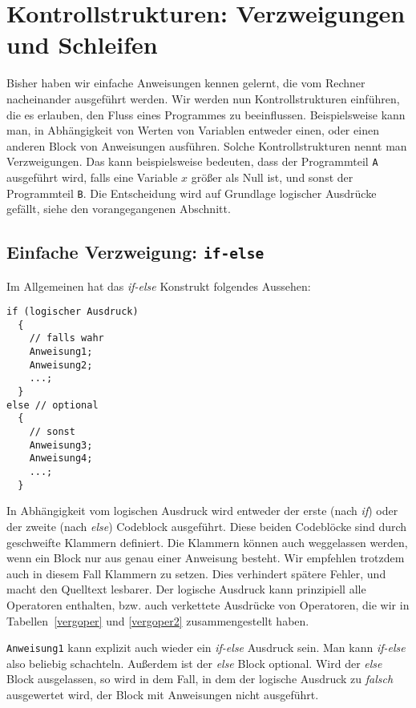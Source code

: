 \section{Kontrollstrukturen: Verzweigungen und Schleifen}

Bisher haben wir einfache Anweisungen kennen gelernt, die vom Rechner nacheinander ausgeführt werden.
Wir werden nun Kontrollstrukturen einführen, die es erlauben, den Fluss eines Programmes zu beeinflussen.
Beispielsweise kann man, in Abhängigkeit von Werten von Variablen entweder einen, oder einen anderen Block von Anweisungen ausführen.
Solche Kontrollstrukturen nennt man Verzweigungen.
Das kann beispielsweise bedeuten, dass der Programmteil \texttt{A} ausgeführt wird, falls eine Variable $x$ größer als Null ist, und sonst der Programmteil \texttt{B}.
Die Entscheidung wird auf Grundlage logischer Ausdrücke gefällt, siehe den vorangegangenen Abschnitt.

\subsection{Einfache Verzweigung: \texttt{if-else}}

Im Allgemeinen hat das \emph{if-else} Konstrukt folgendes Aussehen:

\begin{minipage}{\linewidth}
\begin{lstlisting}[caption={if-else Statement}, belowcaptionskip=0.3em]
if (logischer Ausdruck)
  {
    // falls wahr
    Anweisung1;
    Anweisung2;
    ...;
  }
else // optional
  {
    // sonst
    Anweisung3;
    Anweisung4;
    ...;
  }
\end{lstlisting}
\end{minipage}
In Abhängigkeit vom logischen Ausdruck wird entweder der erste (nach \emph{if}) oder der zweite (nach \emph{else}) Codeblock ausgeführt.
Diese beiden Codeblöcke sind durch geschweifte Klammern definiert.
Die Klammern können auch weggelassen werden, wenn ein Block nur aus genau einer Anweisung besteht.
Wir empfehlen trotzdem auch in diesem Fall Klammern zu setzen.
Dies verhindert spätere Fehler, und macht den Quelltext lesbarer.
Der logische Ausdruck kann prinzipiell alle Operatoren enthalten, bzw. auch verkettete Ausdrücke von Operatoren, die wir in Tabellen~\ref{vergoper} und \ref{vergoper2} zusammengestellt haben.

\verb|Anweisung1| kann explizit auch wieder ein \emph{if-else} Ausdruck sein. 
Man kann \emph{if-else} also beliebig schachteln.
Außerdem ist der \emph{else} Block optional.
Wird der \emph{else} Block ausgelassen, so wird in dem Fall, in dem der logische Ausdruck zu \emph{falsch} ausgewertet wird, der Block mit Anweisungen nicht ausgeführt.

